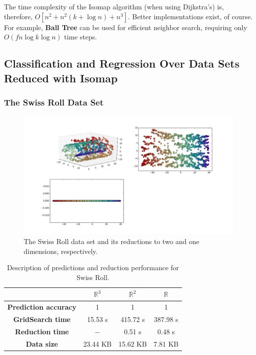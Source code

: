 \documentclass[12pt]{article}
\begin{document}
The time complexity of the Isomap algorithm (when using Dijkstra's) is, therefore, $O[n^2 + n^2(k + \log n) + n^3]$. Better implementations exist, of course. For example, \textbf{Ball Tree} can be used for efficient neighbor search, requiring only $O(f n \log k \log n)$ time steps. \cite{skisomap}

\subsection{Classification and Regression Over Data Sets Reduced with Isomap}

\subsubsection{The Swiss Roll Data Set}

\begin{figure}[H]
	\centering
	\includegraphics[width=\linewidth]{swiss_isomap}
	\captionsetup{justification=centering}
	\caption{The Swiss Roll data set and its reductions to two and one dimensions, respectively.}
\end{figure}

\begin{table}[H]
	\centering
	\begin{tabular}{|c|c|c|c|}
		\hline
		& \textbf{$\mathbb{R}^3$} & \textbf{$\mathbb{R}^2$} & \textbf{$\mathbb{R}$} \\\hline
		\textbf{Prediction accuracy}   & 1            & 1             & 1     \\\hline
		\textbf{GridSearch time} & 15.53 s   & 415.72 s  & 387.98 s  \\\hline
		\textbf{Reduction time}  & $-$         & 0.51 s       & 0.48 s     \\\hline
		\textbf{Data size}          & 23.44 KB & 15.62 KB  & 7.81 KB   \\\hline
	\end{tabular}

	\caption{Description of predictions and reduction performance for Swiss Roll.}
\end{table}
\end{document}
